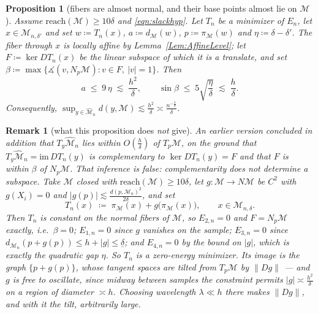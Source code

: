 \documentclass[11pt]{amsart}%
\theoremstyle{plain}
\newtheorem{proposition}[definition]{Proposition}
\newtheorem{remark}[definition]{Remark}
\newcommand{\1}{\mathbf{1}}
\newcommand{\M}{\mathcal{M}}
\begin{document}
\begin{proposition}[fibers are almost normal, and their base points almost lie on $\M$]
    \label{Prop:fiberNormal}
    Assume $\mathrm{reach}(\M)\ge 10\delta$ and \eqref{eqn:slackhyp}. Let $T_n$ be a minimizer of
    $E_n$, let $x\in\M_{n,\delta'}$ and set $w\coloneqq T_n(x)$,
    $a\coloneqq d_\M(w)$, $p\coloneqq\pi_\M(w)$ and $\eta\coloneqq\delta-\delta'$. The fiber through
    $x$ is locally affine by Lemma~\ref{Lem:AffineLevel}; let $F\coloneqq\ker DT_n(x)$ be the linear
    subspace of which it is a translate, and set
    $\beta\coloneqq\max\{\measuredangle(v,N_p\M):v\in F,\ |v|=1\}$. Then
    \[
        a\;\le\;9\,\eta\;\lesssim\;\frac{h^2}{\delta},
        \qquad
        \sin\beta\;\le\;5\sqrt{\frac{\eta}{\delta}}\;\lesssim\;\frac{h}{\delta}.
    \]
    Consequently, $\displaystyle\sup_{y\in\widehat{\M}_n}d(y,\M)\lesssim \frac{h^2}{\delta}\asymp \frac{n^{-\frac{2}{d}}}{\delta}$.
\end{proposition}

\begin{remark}[what this proposition does \emph{not} give]
    \label{Rem:noTangentBound}
    An earlier version concluded in addition that $T_y\widehat{\M}_n$ lies within $O\left(\frac{h}{\delta}\right)$
    of $T_p\M$, on the ground that $T_y\widehat{\M}_n=\mathrm{im}\,DT_n(y)$ is complementary to
    $\ker DT_n(y)=F$ and that $F$ is within $\beta$ of $N_p\M$. That inference is false:
    complementarity does not determine a subspace. Take $\M$ closed with
    $\mathrm{reach}(\M)\ge10\delta$, let $g:\M\to N\M$ be $C^2$ with $g(X_i)=0$ and
    $|g(p)|\lesssim \frac{d(p,\M_n)^2}{2\delta}$, and set
    \[
        T_n(x)\;\coloneqq\;\pi_\M(x)+g\bigl(\pi_\M(x)\bigr),\qquad x\in\M_{n,\delta}.
    \]
    Then $T_n$ is constant on the normal fibers of $\M$, so $E_{2,n}=0$ and $F=N_p\M$ exactly,
    i.e.\ $\beta=0$; $E_{1,n}=0$ since $g$ vanishes on the sample; $E_{3,n}=0$ since
    $d_{\M_n}(p+g(p))\le h+|g|\le\underline\delta$; and $E_{4,n}=0$ by the bound on $|g|$,
    which is exactly the quadratic gap $\eta$. So $T_n$ is a zero-energy minimizer. Its image is
    the graph $\{p+g(p)\}$, whose tangent spaces are tilted from $T_p\M$ by $\|Dg\|$ --- and $g$ is
    free to oscillate, since midway between samples the constraint permits $|g|\asymp \frac{h^2}{\delta}$
    on a region of diameter $\asymp h$. Choosing wavelength $\lambda\ll h$ there makes $\|Dg\|$,
    and with it the tilt, arbitrarily large.
\end{remark}
\end{document}
